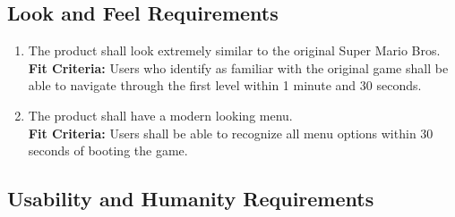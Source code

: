 \documentclass[12pt, titlepage]{article}
\begin{document}
\subsection{Look and Feel Requirements}
\begin{enumerate}[{LF}1. ]
    \item The product shall look extremely similar to the original Super Mario Bros.\\
    \textbf{Fit Criteria:} Users who identify as familiar with the original game shall be able to navigate through the first level within 1 minute and 30 seconds.
    \item The product shall have a modern looking menu.\\
    \textbf{Fit Criteria:} Users shall be able to recognize all menu options within 30 seconds of booting the game.
\end{enumerate}



\subsection{Usability and Humanity Requirements}
\end{document}
